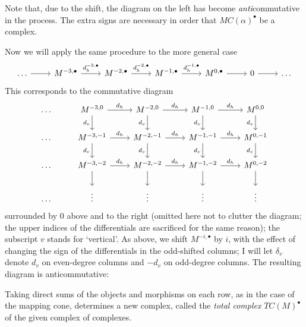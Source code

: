 Note that, due to the shift, the diagram on the left has become
\emph{anti}commutative in the process. The extra signs are necessary
in order that $MC(\alpha)^\bullet$ be a complex.

Now we will apply the same procedure to the more general case
\[\begin{tikzcd}
    \dots \arrow[r] & M^{-3,\bullet} \arrow[r, "d_h^{-3,\bullet}"] &
    M^{-2,\bullet} \arrow[r, "d_h^{-2,\bullet}"] & M^{-1,\bullet}
    \arrow[r, "d_h^{-1,\bullet}"] & M^{0,\bullet} \arrow[r] & 0
    \arrow[r] & \dots
  \end{tikzcd}\] This corresponds to the commutative diagram
\[\begin{tikzcd}
    \dots & M^{-3,0} \arrow[r, "d_h"] \arrow[d, "d_v"'] & M^{-2,0}
    \arrow[r, "d_h"] \arrow[d, "d_v"'] & M^{-1,0} \arrow[r, "d_h"]
    \arrow[d, "d_v"'] & M^{0,0} \arrow[d, "d_v"'] \\
    \dots & M^{-3,-1} \arrow[r, "d_h"] \arrow[d, "d_v"'] & M^{-2,-1}
    \arrow[r, "d_h"] \arrow[d, "d_v"'] & M^{-1,-1} \arrow[r, "d_h"]
    \arrow[d, "d_v"'] & M^{0,-1} \arrow[d, "d_v"'] \\
    \dots & M^{-3,-2} \arrow[r, "d_h"] \arrow[d] & M^{-2,-2} \arrow[r,
    "d_h"] \arrow[d] & M^{-1,-2} \arrow[r, "d_h"] \arrow[d] & M^{0,-2}
    \arrow[d] \\
    \dots & \vdots & \vdots & \vdots & \vdots
  \end{tikzcd}\] surrounded by $0$ above and to the right (omitted
here not to clutter the diagram; the upper indices of the
differentials are sacrificed for the same reason); the subscript $v$
stands for `vertical'. As above, we shift $M^{-i,\bullet}$ by $i$,
with the effect of changing the sign of the differentials in the
odd-shifted columns; I will let $\delta_v$ denote $d_v$ on even-degree
columns and $-d_v$ on odd-degree columns. The resulting diagram is
anticommutative:

Taking direct sums of the objects and morphisms on each row, as in the
case of the mapping cone, determines a new complex, called the
\emph{total complex} $TC(M)^\bullet$ of the given complex of
complexes.

